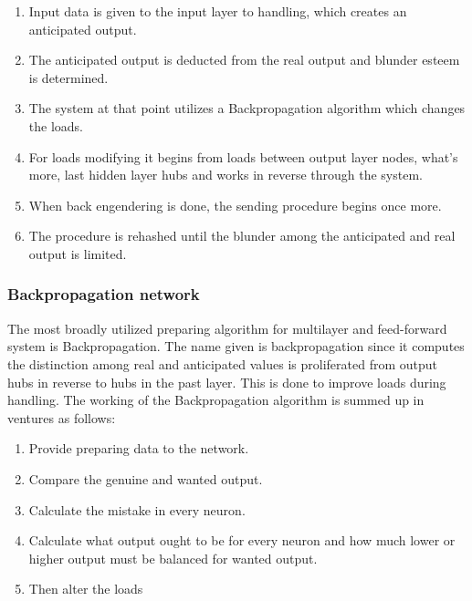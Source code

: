 \documentclass[oneside,12pt]{Classes/VTU}
\begin{document}
  		\begin{enumerate}
  			\item Input data is given to the input layer to handling, which creates an anticipated output. 
  			
  			\item The anticipated output is deducted from the real output and blunder esteem is determined. 
  			
  			\item The system at that point utilizes a Backpropagation algorithm which changes the loads. 
  			
  			\item For loads modifying it begins from loads between output layer nodes, what's more, last hidden layer hubs and works in reverse through the system. 
  			
  			\item When back engendering is done, the sending procedure begins once more. 
  			
  			\item The procedure is rehashed until the blunder among the anticipated and real output is limited.
  		\end{enumerate}
  	\pagebreak
  	
  	\subsubsection{Backpropagation network}
  	The most broadly utilized preparing algorithm for multilayer and feed-forward system is Backpropagation. The name given is backpropagation since it computes the distinction among real and anticipated values is proliferated from output hubs in reverse to hubs in the past layer. This is done to improve loads during handling. The working of the Backpropagation algorithm is summed up in ventures as follows:
  	\begin{enumerate}
  		\item Provide preparing data to the network. 
  		\item Compare the genuine and wanted output. 
  		\item Calculate the mistake in every neuron. 
  		\item Calculate what output ought to be for every neuron and how much lower or higher output must be balanced for wanted output. 
  		\item Then alter the loads
  	\end{enumerate}
  
\end{document}
